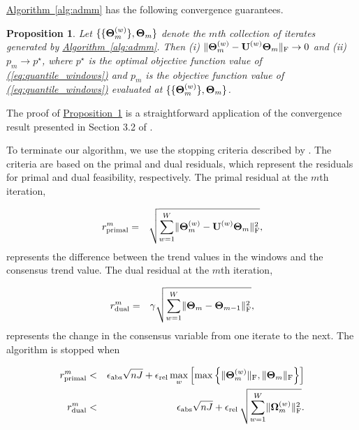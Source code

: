 \documentclass[aoas]{imsart}
\newtheorem{proposition}{Proposition}[section]
\newcommand{\Eqn}[1]{\hyperref[eq:#1]{{\rm (\ref*{eq:#1})}}} %
\newcommand{\Prop}[1]{\hyperref[prop:#1]{Proposition~\ref*{prop:#1}}} %
\newcommand{\Alg}[1]{\hyperref[alg:#1]{Algorithm~\ref*{alg:#1}}} %
\newcommand{\Eqn}[1]{{(\ref{eq:#1})}} %
\newcommand{\Prop}[1]{{Property~\ref{prop:#1}}} %
\newcommand{\Alg}[1]{{Algorithm~\ref{alg:#1}}} %
\newcommand{\M}[1]{{\bm{\mathbf{\MakeUppercase{#1}}}}} %
\newcommand{\Mn}[2]{\M{#1}^{(#2)}} %
\begin{document}
\Alg{admm} has the following convergence guarantees.
\begin{proposition}
	\label{prop:convergence}
	Let $\{\{\Mn{\Theta}{w}_m\}, \M{\Theta}_m\}$ denote the $m$th collection of iterates generated by \Alg{admm}. Then (i)
	$\lVert \Mn{\Theta}{w}_m - \Mn{U}{w}\M{\Theta}_m \rVert_{\text{F}} \rightarrow 0$ and (ii) $p_m \rightarrow p^\star$, where $p^\star$ is the optimal objective function value of
	\Eqn{quantile_windows} and $p_m$ is the objective function value of \Eqn{quantile_windows} evaluated at $\{\{\Mn{\Theta}{w}_m\}, \M{\Theta}_m\}$.
\end{proposition}
The proof of \Prop{convergence} is a straightforward application of the convergence result presented in Section 3.2 of \cite{boyd2011distributed}.

To terminate our algorithm, we use the stopping criteria described by \cite{boyd2011distributed}. The criteria are based on the primal and dual residuals, which represent the residuals for primal and dual feasibility, respectively. The primal residual at the $m$th iteration,

\begin{eqnarray*}
	r_{\text{primal}}^{m} & = & \sqrt{\sum_{w=1}^W\lVert\Mn{\Theta}{w}_{m} - \Mn{U}{w}\M{\Theta}_m\rVert_{\text{F}}^2},
\end{eqnarray*}
represents the difference between the trend values in the windows and the consensus trend value. The dual residual at the $m$th iteration,

\begin{eqnarray*}
	r_{\text{dual}}^{m} & = & \gamma\sqrt{\sum_{w=1}^W \lVert\M{\Theta}_m - \M{\Theta}_{m-1}\rVert_{\text{F}}^2},
\end{eqnarray*}
represents the change in the consensus variable from one iterate to the next. The algorithm is stopped when

\begin{eqnarray}
	r_{\text{primal}}^{m} & < &\epsilon_{\text{abs}}\sqrt{nJ} + \epsilon_{\text{rel}}\,\underset{w}{\max} \left[\max
	\left\{\lVert\Mn{\Theta}{w}_m \rVert_{\text{F}}, \lVert \M{\Theta}_{m} \rVert_{\text{F}} \right\}\right] \nonumber \\%
	r_{\text{dual}}^{m} & < & \epsilon_{\text{abs}}\sqrt{nJ} + \epsilon_{\text{rel}}\,\sqrt{\sum_{w=1}^W
		\lVert \Mn{\Omega}{w}_m \rVert_{\text{F}}^2}.
\label{eq:stopping}
\end{eqnarray}
\end{document}
